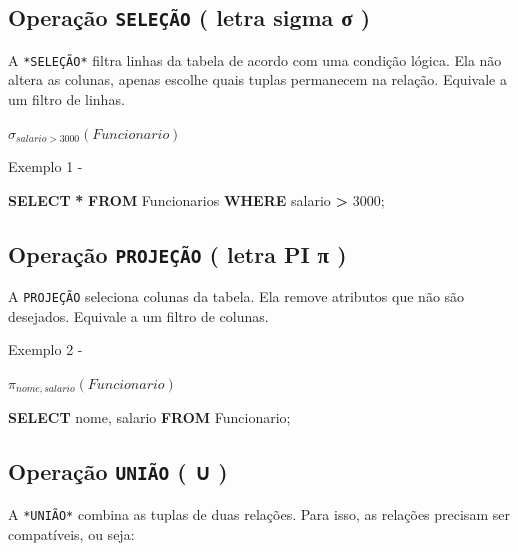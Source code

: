 \documentclass[
]{book}
\newenvironment{Shaded}{\begin{snugshade}}{\end{snugshade}}
\newcommand{\DecValTok}[1]{\textcolor[rgb]{0.00,0.00,0.81}{#1}}
\newcommand{\KeywordTok}[1]{\textcolor[rgb]{0.13,0.29,0.53}{\textbf{#1}}}
\newcommand{\NormalTok}[1]{#1}
\newcommand{\OperatorTok}[1]{\textcolor[rgb]{0.81,0.36,0.00}{\textbf{#1}}}
\begin{document}
\subsection{\texorpdfstring{Operação \texttt{SELEÇÃO} ( letra sigma σ )}{Operação SELEÇÃO ( letra sigma σ )}}\label{operauxe7uxe3o-seleuxe7uxe3o-letra-sigma-ux3c3}

A \texttt{*SELEÇÃO*} filtra linhas da tabela de acordo com uma condição lógica. Ela não altera as colunas, apenas escolhe quais tuplas permanecem na relação. Equivale a um filtro de linhas.

\(\sigma_{salario > 3000}(Funcionario)\)

Exemplo 1 -

\begin{Shaded}
\begin{Highlighting}[]
\KeywordTok{SELECT} \OperatorTok{*} \KeywordTok{FROM}\NormalTok{ Funcionarios }\KeywordTok{WHERE}\NormalTok{ salario }\OperatorTok{\textgreater{}} \DecValTok{3000}\NormalTok{;}
\end{Highlighting}
\end{Shaded}

\subsection{\texorpdfstring{Operação \texttt{PROJEÇÃO} ( letra PI π )}{Operação PROJEÇÃO ( letra PI π )}}\label{operauxe7uxe3o-projeuxe7uxe3o-letra-pi-ux3c0}

A \texttt{PROJEÇÃO} seleciona colunas da tabela. Ela remove atributos que não são desejados. Equivale a um filtro de colunas.

Exemplo 2 -

\(\pi_{nome, salario}(Funcionario)\)

\begin{Shaded}
\begin{Highlighting}[]
\KeywordTok{SELECT}\NormalTok{ nome, salario }\KeywordTok{FROM}\NormalTok{ Funcionario;}
\end{Highlighting}
\end{Shaded}

\subsection{\texorpdfstring{Operação \texttt{UNIÃO} ( ∪ )}{Operação UNIÃO ( ∪ )}}\label{operauxe7uxe3o-uniuxe3o}

A \texttt{*UNIÃO*} combina as tuplas de duas relações. Para isso, as relações precisam ser compatíveis, ou seja:
\end{document}
